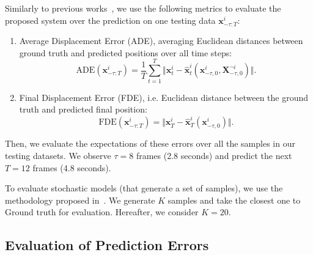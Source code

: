\documentclass[10pt,twocolumn,letterpaper]{article}
\begin{document}
Similarly to previous works~\cite{SocialGAN2018, SocialAttention2018Vemula}, we use the following metrics to evaluate the proposed system over the prediction on one testing data $\mathbf{x}^i_{-\tau:T}$:
\begin{enumerate}[leftmargin=*]
\item Average Displacement Error (ADE), averaging Euclidean distances between ground truth and predicted positions over all time steps: 
\vspace{-0.2cm}
{\small\begin{equation}
\mbox{ADE}(\mathbf{x}^i_{-\tau:T})=\frac{1}{T}\sum_{t=1}^T \Vert {\mathbf{x}}^i_t - \mathbf{\hat{x}}^i_t(\mathbf{x}^i_{-\tau,0},\mathbf{X}^{\neg i}_{-\tau,0}) \Vert.
\label{eq_ADE}
\end{equation}}
\item Final Displacement Error (FDE), i.e. Euclidean distance between the ground truth and predicted final position: 
{\small\begin{equation}
\mbox{FDE}(\mathbf{x}^i_{-\tau:T})= \Vert {\mathbf{x}}^i_T - \mathbf{\hat{x}}^i_T(\mathbf{x}^i_{-\tau,0})  \Vert.
\label{eq_FDE}
\end{equation}}
\end{enumerate}

Then, we evaluate the expectations of these errors over all the samples in our testing datasets. We observe $\tau=8$ frames (2.8 seconds) and predict the next $T=12$ frames (4.8 seconds).

To evaluate stochastic models (that generate a set of samples), we use the methodology proposed in~\cite{SocialGAN2018}. We generate $K$ samples and take the closest one to Ground truth for evaluation. Hereafter, we consider $K=20$.

\subsection{Evaluation of Prediction Errors}
\end{document}
